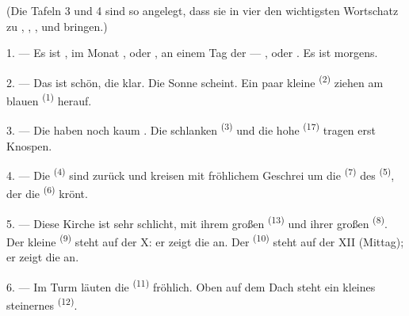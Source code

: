\VUsaut{3.0mm}
\VUsaut{1.6mm}
\VUsaut{3.4mm}

(Die Tafeln 3 und 4 sind so angelegt, dass sie in vier
 den wichtigsten Wortschatz zu ,
, ,  und
 bringen.)
\VUsaut{4.0mm}

\VUsaut{3.0mm}

\VUsaut{2.4mm}

\VUsaut{3.0mm}

1. --- Es ist , im Monat ,  oder
, an einem Tag der  --- ,
 oder . Es ist  morgens.

2. --- Das  ist schön, die  klar. Die Sonne scheint.
Ein paar kleine  \textsuperscript{(2)} ziehen am blauen
 \textsuperscript{(1)} herauf.

3. --- Die  haben noch kaum . Die schlanken
 \textsuperscript{(3)} und die hohe 
\textsuperscript{(17)} tragen erst Knospen.

4. --- Die  \textsuperscript{(4)} sind zurück und kreisen mit
fröhlichem Geschrei um die  \textsuperscript{(7)} des
 \textsuperscript{(5)}, der die 
\textsuperscript{(6)} krönt.

\VUsaut{3.4mm}
\VUsaut{3.0mm}

5. --- Diese Kirche ist sehr schlicht, mit ihrem großen 
\textsuperscript{(13)} und ihrer großen  \textsuperscript{(8)}. Der kleine
 \textsuperscript{(9)} steht auf der X: er zeigt die
 an. Der  \textsuperscript{(10)} steht auf der XII
(Mittag); er zeigt die  an.

6. --- Im Turm läuten die  \textsuperscript{(11)} fröhlich. Oben auf
dem Dach steht ein kleines steinernes  \textsuperscript{(12)}.

